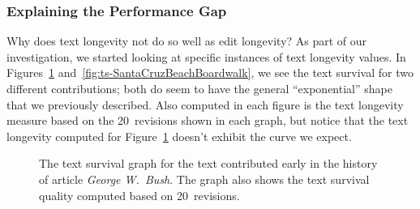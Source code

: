 \subsubsection{Explaining the Performance Gap}

Why does text longevity not do so well as edit longevity?
As part of our investigation, we started looking at specific
instances of text longevity values.
In Figures~\ref{fig:ts-GeorgeWBush} and~\ref{fig:ts-SantaCruzBeachBoardwalk},
we see the text survival for two different contributions;
both do seem to have the general ``exponential'' shape
that we previously described.
Also computed in each figure is the text longevity measure based on
the 20~revisions shown in each graph, but notice that the text
longevity computed for
Figure~\ref{fig:ts-GeorgeWBush} doesn't exhibit the curve we expect.

\begin{figure}[tbph]
\centering
{}
\caption{The text survival graph for the text contributed early
        in the history of article \textit{George W.~Bush}.
	The graph also shows the text survival quality
	computed based on 20~revisions.
	}
\label{fig:ts-GeorgeWBush}
\end{figure}

